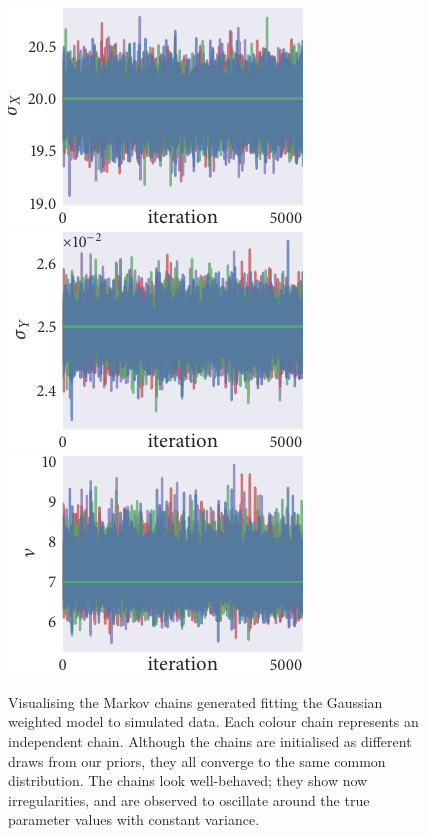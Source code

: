 \begin{figure}[tbp]
  \includegraphics{gauss_trace_sigma_X.pdf}%
  \includegraphics{gauss_trace_sigma_Y.pdf}%
  \includegraphics{gauss_trace_nu.pdf}
  \caption{Visualising the Markov chains generated fitting the Gaussian
    weighted model to simulated data. Each colour chain represents an independent
    chain. Although the chains are initialised as different draws from our
    priors, they all converge to the same common distribution. The chains look
    well-behaved; they show now irregularities, and are observed to oscillate
    around the true parameter values with constant variance.}
  \label{fig:gauss_trace}
\end{figure}%
